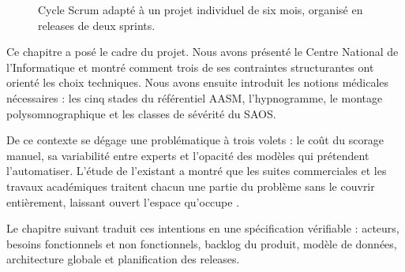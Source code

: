 \begin{figure}[H]
\vspace{0.4cm}
\caption[Cycle Scrum adapté au projet]%
        {Cycle Scrum adapté à un projet individuel de six mois, organisé en releases de
         deux sprints.}
\label{fig:scrum}
\end{figure}


Ce chapitre a posé le cadre du projet. Nous avons présenté le Centre National de
l'Informatique et montré comment trois de ses contraintes structurantes ont orienté les
choix techniques. Nous avons ensuite introduit les notions médicales nécessaires : les
cinq stades du référentiel AASM, l'hypnogramme, le montage polysomnographique et les
classes de sévérité du SAOS.

De ce contexte se dégage une problématique à trois volets : le coût du scorage manuel,
sa variabilité entre experts et l'opacité des modèles qui prétendent l'automatiser.
L'étude de l'existant a montré que les suites commerciales et les travaux académiques
traitent chacun une partie du problème sans le couvrir entièrement, laissant ouvert
l'espace qu'occupe \hypnoria{}.

Le chapitre suivant traduit ces intentions en une spécification vérifiable : acteurs,
besoins fonctionnels et non fonctionnels, backlog du produit, modèle de données,
architecture globale et planification des releases.
